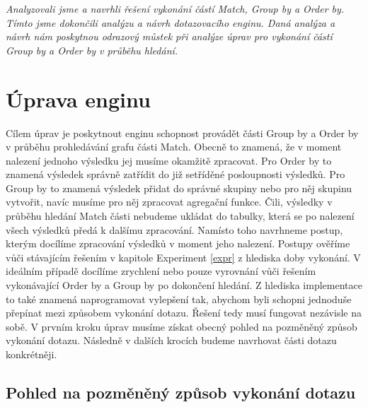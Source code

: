 \bigskip
\textit{Analyzovali jsme a navrhli řešení vykonání částí Match, Group by a Order by.
Tímto jsme dokončili analýzu a návrh dotazovacího enginu.
Daná analýza a návrh nám poskytnou odrazový můstek při analýze úprav pro vykonání částí Group by a Order by v průběhu hledání.
}

\section{Úprava enginu} \label{anal.improvement}

Cílem úprav je poskytnout enginu schopnost provádět části Group by a Order by v průběhu prohledávání grafu části Match.
Obecně to znamená, že v moment nalezení jednoho výsledku jej musíme okamžitě zpracovat.
Pro Order by to znamená výsledek správně zatřídit do již setříděné posloupnosti výsledků.
Pro Group by to znamená výsledek přidat do správné skupiny nebo pro něj skupinu vytvořit, navíc musíme pro něj zpracovat agregační funkce. 
Čili, výsledky v průběhu hledání Match části nebudeme ukládat do tabulky, která se po nalezení všech výsledků předá k dalšímu zpracování.
Namísto toho navrhneme postup, kterým docílíme zpracování výsledků v moment jeho nalezení.
Postupy ověříme vůči stávajícím řešením v kapitole Experiment \ref{expr} z hlediska doby vykonání.
V ideálním případě docílíme zrychlení nebo pouze vyrovnání vůči řešením vykonávající Order by a Group by po dokončení hledání.
Z hlediska implementace to také znamená naprogramovat vylepšení tak, abychom byli schopni jednoduše přepínat mezi způsobem vykonání dotazu.
Řešení tedy musí fungovat nezávisle na sobě. 
V prvním kroku úprav musíme získat obecný pohled na pozměněný způsob vykonání dotazu.
Následně v dalších krocích budeme navrhovat části dotazu konkrétněji.

\subsection{Pohled na pozměněný způsob vykonání dotazu}

